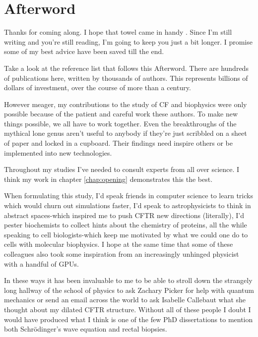 \chapter{Afterword}
\label{chap:Afterword}

Thanks for coming along. I hope that towel came in handy \cite{adamd1979}. Since I'm still writing and you're still reading, I'm going to keep you just a bit longer. I promise some of my best advice have been saved till the end. 

Take a look at the reference list that follows this Afterword. There are hundreds of publications here, written by thousands of authors. This represents billions of dollars of investment, over the course of more than a century. 

However meager, my contributions to the study of CF and biophysics were only possible because of the patient and careful work these authors. To make new things possible, we all have to work together. Even the breakthroughs of the mythical lone genus aren't useful to anybody if they're just scribbled on a sheet of paper and locked in a cupboard. Their findings need inspire others or be implemented into new technologies.

Throughout my studies I've needed to consult experts from all over science. I think my work in chapter \ref{chap:opening} demonstrates this the best. 

When formulating this study, I'd speak friends in computer science to learn tricks which would churn out simulations faster, I'd speak to astrophysicists to think in abstract spaces-which inspired me to push CFTR new directions (literally), I'd pester biochemists to collect hints about the chemistry of proteins, all the while speaking to cell biologists-which keep me motivated by what we could one do to cells with molecular biophysics. I hope at the same time that some of these colleagues also took some inspiration from an increasingly unhinged physicist with a handful of GPUs. 

In these ways it has been invaluable to me to be able to stroll down the strangely long hallway of the school of physics to ask Zachary Picker for help with quantum mechanics or send an email across the world to ask Isabelle Callebaut what she thought about my dilated CFTR structure. Without all of these people I doubt I would have produced what I think is one of the few PhD dissertations to mention both Schr\"odinger's wave equation and rectal biopsies. 

